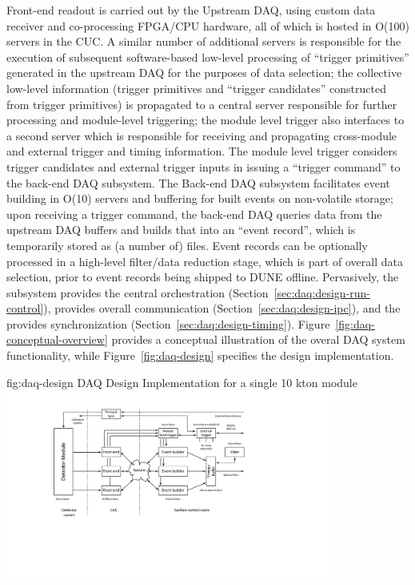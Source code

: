 Front-end readout is carried out by the Upstream DAQ, using custom data receiver
and co-processing FPGA/CPU hardware, all of which is hosted in O(100) servers in
the CUC.
A similar number of additional servers is responsible for the execution of
subsequent software-based low-level processing of ``trigger primitives''
generated in the upstream DAQ for the purposes of data selection; the collective
low-level information (trigger primitives and ``trigger candidates'' constructed
from trigger primitives) is propagated to a central server responsible for
further processing and module-level triggering; the module level trigger also
interfaces to a second server which is responsible for receiving and propagating
cross-module and external trigger and timing information.
The module level trigger considers trigger candidates and external trigger
inputs in issuing a ``trigger command'' to the back-end DAQ subsystem.
The Back-end DAQ subsystem facilitates event building in O(10) servers and
buffering for built events on non-volatile storage; upon receiving a trigger
command, the back-end DAQ queries data from the upstream DAQ buffers and builds
that into an ``event record'', which is temporarily stored as (a number of)
files.
Event records can be optionally processed in a high-level filter/data reduction
stage, which is part of overall data selection, prior to event records being
shipped to DUNE offline.
Pervasively, the  subsystem provides the central orchestration
(Section~\ref{sec:daq:design-run-control}),  provides overall
communication (Section~\ref{sec:daq:design-ipc}), and the 
provides synchronization (Section~\ref{sec:daq:design-timing}).
Figure~\ref{fig:daq-conceptual-overview} provides a conceptual illustration of
the overal DAQ system functionality, while Figure~\ref{fig:daq-design} specifies
the design implementation. 

\begin{dunefigure}{fig:daq-design}{ DAQ Design Implementation for a
    single 10 kton module}
  \includegraphics[width=0.8\textwidth]{daq-overview.pdf}
\end{dunefigure}

